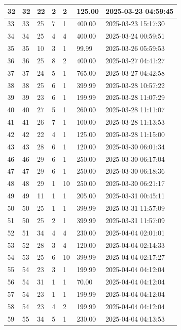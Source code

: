 \begin{longtable}{|l|l|l|l|l|l|l|}
32 & 32 & 22 & 2 & 2 & 125.00 & 2025-03-23 04:59:45 \\ \hline 
33 & 33 & 25 & 7 & 1 & 400.00 & 2025-03-23 15:17:30 \\ \hline 
34 & 34 & 25 & 4 & 4 & 400.00 & 2025-03-24 00:59:51 \\ \hline 
35 & 35 & 10 & 3 & 1 & 99.99 & 2025-03-26 05:59:53 \\ \hline 
36 & 36 & 25 & 8 & 2 & 400.00 & 2025-03-27 04:41:27 \\ \hline 
37 & 37 & 24 & 5 & 1 & 765.00 & 2025-03-27 04:42:58 \\ \hline 
38 & 38 & 25 & 6 & 1 & 399.99 & 2025-03-28 10:57:22 \\ \hline 
39 & 39 & 23 & 6 & 1 & 199.99 & 2025-03-28 11:07:29 \\ \hline 
40 & 40 & 27 & 5 & 1 & 260.00 & 2025-03-28 11:11:07 \\ \hline 
41 & 41 & 26 & 7 & 1 & 100.00 & 2025-03-28 11:13:53 \\ \hline 
42 & 42 & 22 & 4 & 1 & 125.00 & 2025-03-28 11:15:00 \\ \hline 
43 & 43 & 28 & 6 & 1 & 120.00 & 2025-03-30 06:01:34 \\ \hline 
46 & 46 & 29 & 6 & 1 & 250.00 & 2025-03-30 06:17:04 \\ \hline 
47 & 47 & 29 & 6 & 1 & 250.00 & 2025-03-30 06:18:36 \\ \hline 
48 & 48 & 29 & 1 & 10 & 250.00 & 2025-03-30 06:21:17 \\ \hline 
49 & 49 & 11 & 1 & 1 & 205.00 & 2025-03-31 00:45:11 \\ \hline 
50 & 50 & 25 & 1 & 1 & 399.99 & 2025-03-31 11:57:09 \\ \hline 
51 & 50 & 25 & 2 & 1 & 399.99 & 2025-03-31 11:57:09 \\ \hline 
52 & 51 & 34 & 4 & 4 & 230.00 & 2025-04-04 02:01:01 \\ \hline 
53 & 52 & 28 & 3 & 4 & 120.00 & 2025-04-04 02:14:33 \\ \hline 
54 & 53 & 25 & 6 & 10 & 399.99 & 2025-04-04 02:17:27 \\ \hline 
55 & 54 & 23 & 3 & 1 & 199.99 & 2025-04-04 04:12:04 \\ \hline 
56 & 54 & 31 & 1 & 1 & 70.00 & 2025-04-04 04:12:04 \\ \hline 
57 & 54 & 23 & 1 & 1 & 199.99 & 2025-04-04 04:12:04 \\ \hline 
58 & 54 & 23 & 4 & 2 & 199.99 & 2025-04-04 04:12:04 \\ \hline 
59 & 55 & 34 & 5 & 1 & 230.00 & 2025-04-04 04:13:53 \\ \hline 

\end{longtable}
